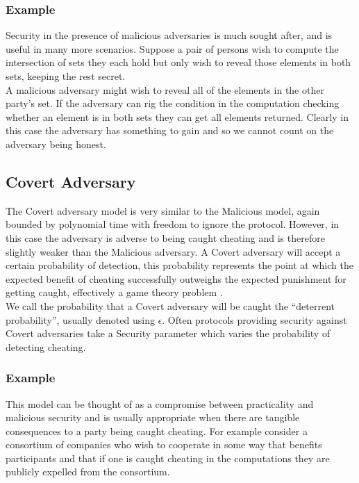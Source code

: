\documentclass[ %
                    author={Nicholas Tutte},
                supervisor={Prof. Nigel Smart},
                    degree={MEng},
                     title={Secure Two Party Computation},
                  subtitle={A practical comparison of recent protocols},
                      type={Research - GG1K},
                      year={2015} ]{dissertation}
\begin{document}
				\subsubsection{Example}
					Security in the presence of malicious adversaries is much sought after, and is useful in many more scenarios. Suppose a pair of persons wish to compute the intersection of sets they each hold but only wish to reveal those elements in both sets, keeping the rest secret.\\

					A malicious adversary might wish to reveal all of the elements in the other party's set. If the adversary can rig the condition in the computation checking whether an element is in both sets they can get all elements returned. Clearly in this case the adversary has something to gain and so we cannot count on the adversary being honest.\\


			\subsection{Covert Adversary}
				The Covert adversary model is very similar to the Malicious model, again bounded by polynomial time with freedom to ignore the protocol. However, in this case the adversary is adverse to being caught cheating and is therefore slightly weaker than the Malicious adversary. A Covert adversary will accept a certain probability of detection, this probability represents the point at which the expected benefit of cheating successfully outweighs the expected punishment for getting caught, effectively a game theory problem \cite{WhenGameTheoryMetSMC}.\\

				We call the probability that a Covert adversary will be caught the ``deterrent probability'', usually denoted using $\epsilon$. Often protocols providing security against Covert adversaries take a Security parameter which varies the probability of detecting cheating.

				\subsubsection{Example} 

					This model can be thought of as a compromise between practicality and malicious security and is usually appropriate when there are tangible consequences to a party being caught cheating. For example consider a consortium of companies who wish to cooperate in some way that benefits participants and that if one is caught cheating in the computations they are publicly expelled from the consortium.\\
\end{document}
